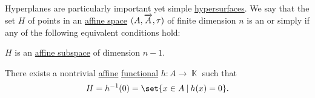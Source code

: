 \begin{definition}\label{def:affine_hyperplane}
  Hyperplanes are particularly important yet simple \hyperref[rem:geometric_shape]{hypersurfaces}. We say that the set \( H \) of points in an \hyperref[def:affine_space]{affine space} \( (A, \overrightarrow{A}, \tau) \) of finite dimension \( n \) is an  or simply  if any of the following equivalent conditions hold:

  \begin{thmenum}
     \( H \) is an \hyperref[def:affine_subspace]{affine subspace} of dimension \( n - 1 \).

     There exists a nontrivial \hyperref[def:affine_operator]{affine} \hyperref[rem:functional]{functional} \( h: A \to \BbbK \) such that
    \begin{equation*}
      H = h^{-1}(0) = \set{ x \in A \given h(x) = 0 }.
    \end{equation*}
  \end{thmenum}
\end{definition}
